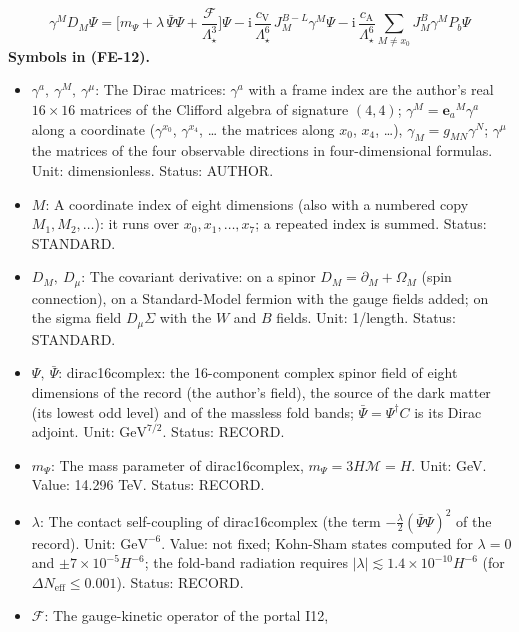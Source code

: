 \documentclass[
  10pt,
]{article}
\providecommand{\tightlist}{%
  \setlength{\itemsep}{0pt}\setlength{\parskip}{0pt}}
\begin{document}
\[
\gamma^MD_M\Psi = \Big[m_\Psi + \lambda\,\bar\Psi\Psi + \frac{\mathcal{F}}{\Lambda_\star^3}\Big]\Psi
 - \mathrm{i}\,\frac{c_{\mathrm{V}}}{\Lambda_\star^6}\,J^{B-L}_M\gamma^M\Psi
 - \mathrm{i}\,\frac{c_{\mathrm{A}}}{\Lambda_\star^6}\sum_{M\ne x_0}J^{B}_M\gamma^MP_b\Psi \tag{FE-12}
\] \textbf{Symbols in (FE-12).}

\begin{itemize}
\tightlist
\item
  \(\gamma^a,\ \gamma^M,\ \gamma^\mu\): The Dirac matrices: \(\gamma^a\)
  with a frame index are the author's real \(16 \times 16\) matrices of
  the Clifford algebra of signature \((4, 4)\);
  \(\gamma^M = \mathbf{e}_a{}^M\gamma^a\) along a coordinate
  (\(\gamma^{x_0}\), \(\gamma^{x_4}\), \ldots{} the matrices along
  \(x_0\), \(x_4\), \ldots), \(\gamma_M = g_{MN}\gamma^N\);
  \(\gamma^\mu\) the matrices of the four observable directions in
  four-dimensional formulas. Unit: dimensionless. Status: AUTHOR.
\item
  \(M\): A coordinate index of eight dimensions (also with a numbered
  copy \(M_1, M_2, \dots\)): it runs over \(x_0, x_1, \dots, x_7\); a
  repeated index is summed. Status: STANDARD.
\item
  \(D_M,\ D_\mu\): The covariant derivative: on a spinor
  \(D_M = \partial_M + \Omega_M\) (spin connection), on a Standard-Model
  fermion with the gauge fields added; on the sigma field
  \(D_\mu\Sigma\) with the \(W\) and \(B\) fields. Unit: 1/length.
  Status: STANDARD.
\item
  \(\Psi,\ \bar\Psi\): dirac16complex: the 16-component complex spinor
  field of eight dimensions of the record (the author's field), the
  source of the dark matter (its lowest odd level) and of the massless
  fold bands; \(\bar\Psi = \Psi^\dagger C\) is its Dirac adjoint. Unit:
  \(\mathrm{GeV}^{7/2}\). Status: RECORD.
\item
  \(m_\Psi\): The mass parameter of dirac16complex,
  \(m_\Psi = 3H\mathcal{M} = H\). Unit: GeV. Value: 14.296 TeV. Status:
  RECORD.
\item
  \(\lambda\): The contact self-coupling of dirac16complex (the term
  \(-\frac{\lambda}{2}(\bar\Psi\Psi)^2\) of the record). Unit:
  \(\mathrm{GeV}^{-6}\). Value: not fixed; Kohn-Sham states computed for
  \(\lambda = 0\) and \(\pm7\times10^{-5}H^{-6}\); the fold-band
  radiation requires
  \(\lvert\lambda\rvert \lesssim 1.4\times10^{-10}H^{-6}\) (for
  \(\Delta N_{\mathrm{eff}} \le 0.001\)). Status: RECORD.
\item
  \(\mathcal{F}\): The gauge-kinetic operator of the portal I12,

\end{itemize}
\end{document}
